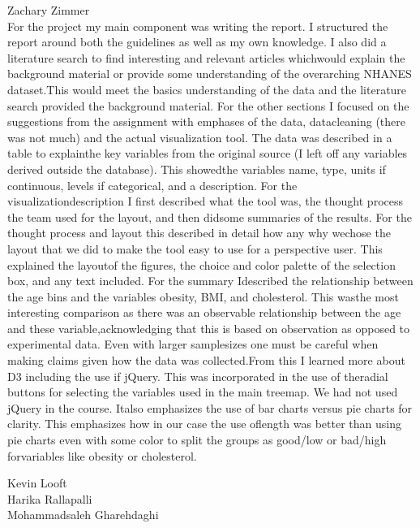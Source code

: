 \documentclass[12pt]{article}
\numberwithin{figure}{section}
\begin{document}
{\sf Zachary Zimmer}\\
For the project my main component was writing the report. I structured the report around both the guidelines as well as my own knowledge. I also did a literature search to find interesting and relevant articles whichwould explain the background material or provide some understanding of the overarching NHANES dataset.This would meet the basics understanding of the data and the literature search provided the background material. For the other sections I focused on the suggestions from the assignment with emphases of the data, datacleaning (there was not much) and the actual visualization tool. The data was described in a table to explainthe key variables from the original source (I left off any variables derived outside the database). This showedthe variables name, type, units if continuous, levels if categorical, and a description. For the visualizationdescription I first described what the tool was, the thought process the team used for the layout, and then didsome summaries of the results. For the thought process and layout this described in detail how any why wechose the layout that we did to make the tool easy to use for a perspective user. This explained the layoutof the figures, the choice and color palette of the selection box, and any text included. For the summary Idescribed the relationship between the age bins and the variables obesity, BMI, and cholesterol. This wasthe most interesting comparison as there was an observable relationship between the age and these variable,acknowledging that this is based on observation as opposed to experimental data. Even with larger samplesizes one must be careful when making claims given how the data was collected.From this I learned more about D3 including the use if jQuery. This was incorporated in the use of theradial buttons for selecting the variables used in the main treemap. We had not used jQuery in the course. Italso emphasizes the use of bar charts versus pie charts for clarity. This emphasizes how in our case the use oflength was better than using pie charts even with some color to split the groups as good/low or bad/high forvariables like obesity or cholesterol.

{\sf Kevin Looft}\\

{\sf Harika Rallapalli}\\

{\sf Mohammadsaleh Gharehdaghi}\\

\newpage
\end{document}
